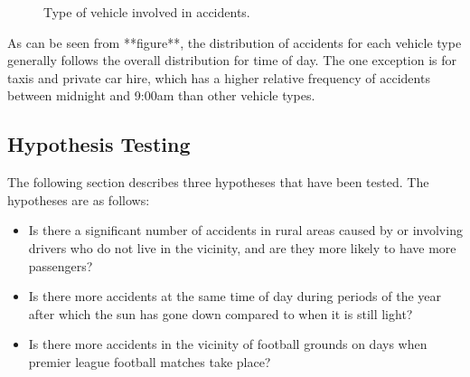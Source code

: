 \documentclass[12pt]{article}
\begin{document}
\begin{figure}[h]
\centering     %
{}
\caption{Type of vehicle involved in accidents.}
\end{figure}

As can be seen from **figure**, the distribution of accidents for each vehicle type generally follows the overall distribution for time of day. The one exception is for taxis and private car hire, which has a higher relative frequency of accidents between midnight and 9:00am than other vehicle types.

\subsection{Hypothesis Testing}

The following section describes three hypotheses that have been tested. The hypotheses are as follows:

\begin{itemize}
\item Is there a significant number of accidents in rural areas caused by or involving drivers who do not live in the vicinity, and are they more likely to have more passengers?
\item Is there more accidents at the same time of day during periods of the year after which the sun has gone down compared to when it is still light?
\item Is there more accidents in the vicinity of football grounds on days when premier league football matches take place?
\end{itemize}
\end{document}
